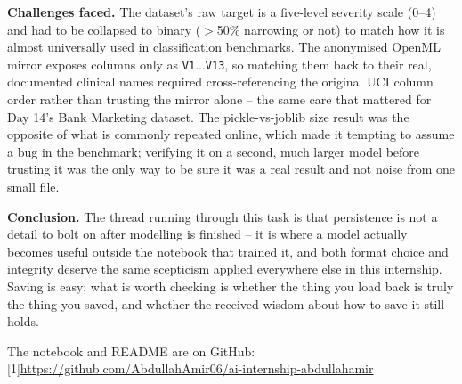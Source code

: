 \documentclass[11pt,a4paper]{article}
\begin{document}
\textbf{Challenges faced.} The dataset's raw target is a five-level severity scale
(0--4) and had to be collapsed to binary ($>$50\% narrowing or not) to match how it is
almost universally used in classification benchmarks. The anonymised OpenML mirror
exposes columns only as \texttt{V1}...\texttt{V13}, so matching them back to their real,
documented clinical names required cross-referencing the original UCI column order
rather than trusting the mirror alone -- the same care that mattered for Day 14's Bank
Marketing dataset. The pickle-vs-joblib size result was the opposite of what is commonly
repeated online, which made it tempting to assume a bug in the benchmark; verifying it
on a second, much larger model before trusting it was the only way to be sure it was a
real result and not noise from one small file.

\textbf{Conclusion.} The thread running through this task is that persistence is not a
detail to bolt on after modelling is finished -- it is where a model actually becomes
useful outside the notebook that trained it, and both format choice and integrity
deserve the same scepticism applied everywhere else in this internship. Saving is easy;
what is worth checking is whether the thing you load back is truly the thing you saved,
and whether the received wisdom about how to save it still holds.

\vspace{0.4cm}
\noindent The notebook and README are on GitHub: {\small\scalebox{0.72}[1]{\url{https://github.com/AbdullahAmir06/ai-internship-abdullahamir}}}
\end{document}
